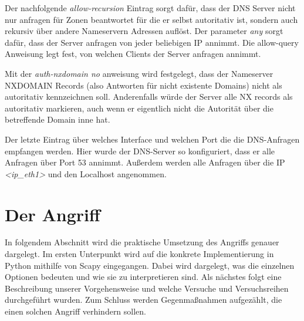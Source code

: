 \documentclass[10pt,a4paper]{article}
\begin{document}
Der nachfolgende \emph{allow-recursion} Eintrag sorgt dafür, dass der DNS Server nicht nur anfragen für Zonen beantwortet für die er selbst autoritativ ist, sondern auch rekursiv über andere Nameservern Adressen auflöst. Der parameter \emph{any} sorgt dafür, dass der Server anfragen von jeder beliebigen IP annimmt. Die allow-query Anweisung legt fest, von welchen Clients der Server anfragen annimmt.

Mit der \emph{auth-nxdomain no} anweisung wird festgelegt, dass der Nameserver NXDOMAIN Records (also Antworten für nicht existente Domains) nicht als autoritativ kennzeichnen soll. Anderenfalls würde der Server alle NX records als autoritativ  markieren, auch wenn er eigentlich nicht die Autorität über die betreffende Domain inne hat.

Der letzte Eintrag über welches Interface und welchen Port die die DNS-Anfragen empfangen werden. Hier wurde der DNS-Server so konfiguriert, dass er alle Anfragen über Port 53 annimmt. Außerdem werden alle Anfragen über die IP \emph{<ip\_eth1>} und den Localhost angenommen.

\section{Der Angriff}
In folgendem Abschnitt wird die praktische Umsetzung des Angriffs genauer dargelegt. Im ersten Unterpunkt wird auf die konkrete Implementierung in Python mithilfe von Scapy eingegangen. Dabei wird dargelegt, was die einzelnen Optionen bedeuten und wie sie zu interpretieren sind. Als nächstes folgt eine Beschreibung unserer Vorgehensweise und welche Versuche und Versuchsreihen durchgeführt wurden. Zum Schluss werden Gegenmaßnahmen aufgezählt, die einen solchen Angriff verhindern sollen.
\end{document}
